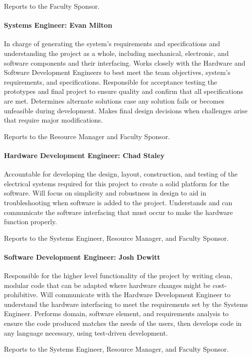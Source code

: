 Reports to the Faculty Sponsor. 

\paragraph{Systems Engineer: Evan Milton}
In charge of generating the system's requirements and specifications and understanding the project as a whole, including mechanical, electronic, and software components and their interfacing.
Works closely with the Hardware and Software Development Engineers to best meet the team objectives, system's requirements, and specifications.
Responsible for acceptance testing the prototypes and final project to ensure quality and confirm that all specifications are met.
Determines alternate solutions case any solution fails or becomes unfeasible during development.
Makes final design decisions when challenges arise that require major modifications.

Reports to the Resource Manager and Faculty Sponsor.

\paragraph{Hardware Development Engineer: Chad Staley}
Accountable for developing the design, layout, construction, and testing of the electrical systems required for this project to create a solid platform for the software.
Will focus on simplicity and robustness in design to aid in troubleshooting when software is added to the project.
Understands and can communicate the software interfacing that must occur to make the hardware function properly.

Reports to the Systems Engineer, Resource Manager, and Faculty Sponsor. 

\paragraph{Software Development Engineer: Josh Dewitt}
Responsible for the higher level functionality of the project by writing clean, modular code that can be adapted where hardware changes might be cost-prohibitive.
Will communicate with the Hardware Development Engineer to understand the hardware interfacing to meet the requirements set by the Systems Engineer.
Performs domain, software element, and requirements analysis to ensure the code produced matches the needs of the users, then develops code in any language necessary, using test­-driven development.

Reports to the Systems Engineer, Resource Manager, and Faculty Sponsor.

